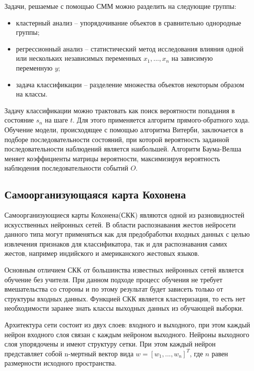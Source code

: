 Задачи, решаемые с помощью СММ можно разделить на следующие группы:

\begin{itemize}
	\item кластерный анализ\cite{Helske} -- упорядочивание объектов в сравнительно однородные группы;
	\item регрессионный анализ\cite{Fridman} -- статистический метод исследования влияния одной или нескольких независимых переменных $x_1, ..., x_n$ на зависимую переменную $y$;
	\item задача классификации\cite{Benyacoub} -- разделение множества объектов некоторым образом на классы.
\end{itemize}

Задачу классификации можно трактовать как поиск вероятности попадания в состояние $s_n$ на шаге $t$. Для этого применяется алгоритм прямого-обратного хода. Обучение модели, происходящее с помощью алгоритма Витерби, заключается в подборе последовательности состояний, при которой вероятность заданной последовательности наблюдений является наибольшей. Алгоритм Баума-Велша меняет коэффициенты матрицы вероятности, максимизируя вероятность наблюдения последовательности событий $O$.

\subsection{Самоорганизующаяся карта Кохонена}

Самоорганизующиеся карты Кохонена(СКК) являются одной из разновидностей искусственных нейронных сетей. В области распознавания жестов нейросети данного типа могут применяться как для предобработки входных данных с целью извлечения признаков для классификатора\cite{Gao}, так и для распознавания самих жестов, например индийского\cite{Tewari2012AVR} и американского\cite{Karn} жестовых языков.

Основным отличием СКК от большинства известных нейронных сетей является обучение без учителя. При данном подходе процесс обучения не требует вмешательства со стороны и по этому результат будет зависеть только от структуры входных данных. Функцией СКК является кластеризация, то есть нет необходимости заранее знать классы выходных данных из обучающей выборки.

Архитектура сети состоит из двух слоев: входного и выходного, при этом каждый нейрон входного слоя связан с каждым нейроном выходного. Нейроны выходного слоя упорядочены и имеют структуру сетки. При этом каждый нейрон представляет собой n-мертный вектор вида $w=[w_1, ..., w_n]^T$, где $n$ равен размерности исходного пространства.

